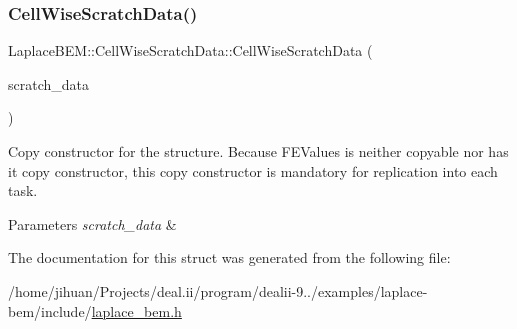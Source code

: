 \subsubsection{\texorpdfstring{Cell\+Wise\+Scratch\+Data()}{CellWiseScratchData()}\hspace{0.1cm}{\footnotesize\ttfamily [2/2]}}
{\footnotesize\ttfamily Laplace\+B\+E\+M\+::\+Cell\+Wise\+Scratch\+Data\+::\+Cell\+Wise\+Scratch\+Data (\begin{DoxyParamCaption}\item[{const \hyperlink{structLaplaceBEM_1_1CellWiseScratchData}{Cell\+Wise\+Scratch\+Data} \&}]{scratch\+\_\+data }\end{DoxyParamCaption})\hspace{0.3cm}{\ttfamily [inline]}}

Copy constructor for the structure. Because {\ttfamily F\+E\+Values} is neither copyable nor has it copy constructor, this copy constructor is mandatory for replication into each task. 
\begin{DoxyParams}{Parameters}
{\em scratch\+\_\+data} & \\
\hline
\end{DoxyParams}


The documentation for this struct was generated from the following file\+:\begin{DoxyCompactItemize}
\item 
/home/jihuan/\+Projects/deal.\+ii/program/dealii-\/9../examples/laplace-\/bem/include/\hyperlink{laplace__bem_8h}{laplace\+\_\+bem.\+h}\end{DoxyCompactItemize}
